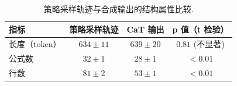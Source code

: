 \begin{longtable}{lccc}
\caption{策略采样轨迹与合成输出的结构属性比较.}\label{cat-tab:cat-qual}\\

\toprule
\textbf{指标} & \textbf{策略采样轨迹} & \textbf{CaT 输出} & \textbf{p 值（t 检验）} \\
\midrule
长度（token） & $634 \pm 11$ & $639 \pm 20$ & $0.81$ (不显著) \\
公式数 & $32 \pm 1$ & $28 \pm 1$ & $<0.01$ \\
行数 & $81 \pm 2$ & $53 \pm 1$ & $<0.01$ \\
\bottomrule

\end{longtable}
